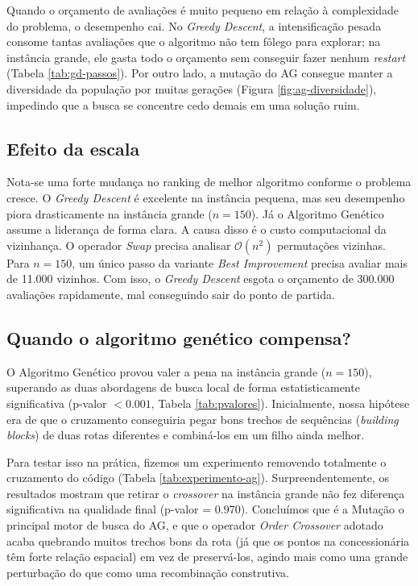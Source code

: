 Quando o orçamento de avaliações é muito pequeno em relação à complexidade do problema, o desempenho cai. No \textit{Greedy Descent}, a intensificação pesada consome tantas avaliações que o algoritmo não tem fôlego para explorar; na instância grande, ele gasta todo o orçamento sem conseguir fazer nenhum \textit{restart} (Tabela \ref{tab:gd-passos}). Por outro lado, a mutação do AG consegue manter a diversidade da população por muitas gerações (Figura \ref{fig:ag-diversidade}), impedindo que a busca se concentre cedo demais em uma solução ruim.

\subsection{Efeito da escala}
\label{subsec:escala}

Nota-se uma forte mudança no ranking de melhor algoritmo conforme o problema cresce. O \textit{Greedy Descent} é excelente na instância pequena, mas seu desempenho piora drasticamente na instância grande ($n=150$). Já o Algoritmo Genético assume a liderança de forma clara. A causa disso é o custo computacional da vizinhança. O operador \textit{Swap} precisa analisar $\mathcal{O}(n^2)$ permutações vizinhas. Para $n=150$, um único passo da variante \textit{Best Improvement} precisa avaliar mais de 11.000 vizinhos. Com isso, o \textit{Greedy Descent} esgota o orçamento de 300.000 avaliações rapidamente, mal conseguindo sair do ponto de partida.

\subsection{Quando o algoritmo genético compensa?}
\label{subsec:quando-ag}

O Algoritmo Genético provou valer a pena na instância grande ($n=150$), superando as duas abordagens de busca local de forma estatisticamente significativa (p-valor $< 0.001$, Tabela \ref{tab:pvalores}). Inicialmente, nossa hipótese era de que o cruzamento conseguiria pegar bons trechos de sequências (\textit{building blocks}) de duas rotas diferentes e combiná-los em um filho ainda melhor. 

Para testar isso na prática, fizemos um experimento removendo totalmente o cruzamento do código (Tabela \ref{tab:experimento-ag}). Surpreendentemente, os resultados mostram que retirar o \textit{crossover} na instância grande não fez diferença significativa na qualidade final (p-valor = 0.970). Concluímos que é a Mutação o principal motor de busca do AG, e que o operador \textit{Order Crossover} adotado acaba quebrando muitos trechos bons da rota (já que os pontos na concessionária têm forte relação espacial) em vez de preservá-los, agindo mais como uma grande perturbação do que como uma recombinação construtiva.


